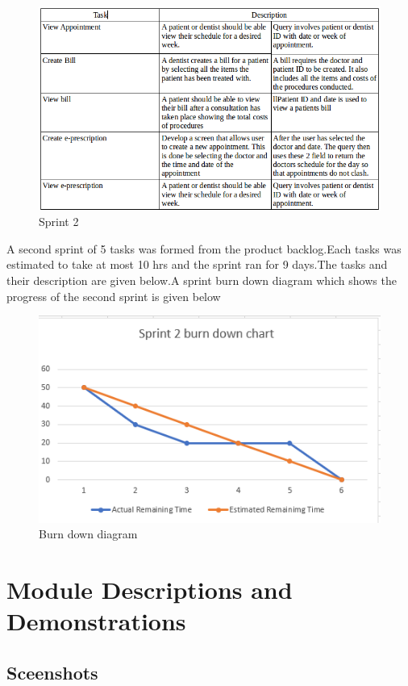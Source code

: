 \documentclass[12pt]{article}
\begin{document}
\newpage
\begin{figure}[h]
    \centering
    \includegraphics[width=\linewidth]{sprint2.PNG}
    \caption{Sprint 2}
    \label{fig:ERD}
\end{figure}

A second sprint of 5 tasks was formed from the product backlog.Each tasks was estimated to take at most 10 hrs and the sprint ran for 9 days.The tasks and their description are given below.A sprint burn down diagram which shows the progress of the second sprint is given below 
\begin{figure}[h]
    \centering
    
    \includegraphics[width=\linewidth]{sprint3.PNG}
    \caption{Burn down diagram}
    \label{fig:ERD}
    \end{figure}
    \newpage
\section{Module Descriptions and Demonstrations} 
\subsection{Sceenshots}
\end{document}
